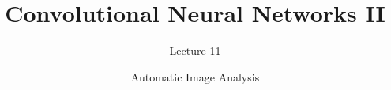 \documentclass[aspectratio=169,xcolor=dvipsnames]{beamer}
\title[short title]{Convolutional Neural Networks II}
\subtitle{Lecture 11}
\author{Automatic Image Analysis}
\begin{document}
\begin{frame}
    \titlepage
\end{frame}


%



\end{document}

